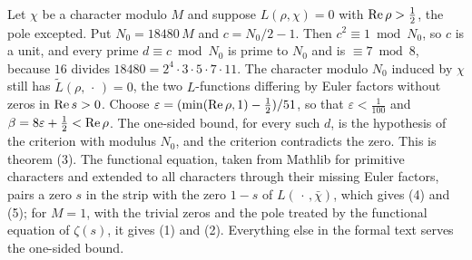 
 Let $\chi$ be a character modulo $M$ and suppose $L(\rho,\chi)=0$ with
$\operatorname{Re}\rho>\tfrac12$, the pole excepted. Put $N_0=18480\,M$ and $c=N_0/2-1$. Then $c^2\equiv1\bmod N_0$, so $c$ is a
unit, and every prime $d\equiv c\bmod N_0$ is prime to $N_0$ and is $\equiv7\bmod 8$, because $16$ divides
$18480=2^4\cdot3\cdot5\cdot7\cdot11$. The character modulo $N_0$ induced by $\chi$ still has
$\tilde L(\rho,\,\cdot\,)=0$, the two $L$-functions differing by Euler factors without zeros in $\operatorname{Re} s>0$. Choose
$\varepsilon=(\min(\operatorname{Re}\rho,1)-\tfrac12)/51$, so that $\varepsilon<\tfrac1{100}$ and
$\beta=8\varepsilon+\tfrac12<\operatorname{Re}\rho$. The one-sided bound, for every such $d$, is the hypothesis of the criterion
with modulus $N_0$, and the criterion contradicts the zero. This is theorem (3). The functional equation, taken from
Mathlib for primitive characters and extended to all characters through their missing Euler factors, pairs a zero $s$
in the strip with the zero $1-s$ of $L(\,\cdot\,,\bar\chi)$, which gives (4) and (5); for $M=1$, with the trivial zeros
and the pole treated by the functional equation of $\zeta(s)$, it gives (1) and (2). Everything else in the formal text
serves the one-sided bound.


